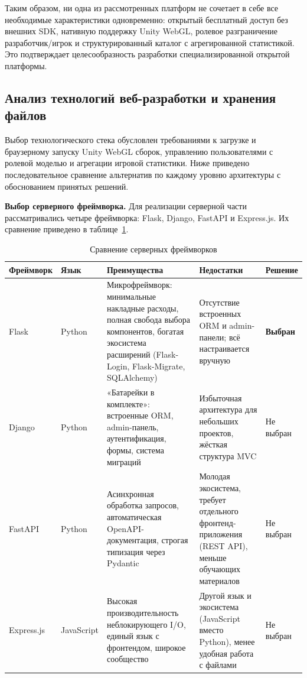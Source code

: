Таким образом, ни одна из рассмотренных платформ не сочетает в себе все необходимые
характеристики одновременно: открытый бесплатный доступ без внешних SDK, нативную
поддержку Unity WebGL, ролевое разграничение разработчик/игрок и структурированный
каталог с агрегированной статистикой. Это подтверждает целесообразность разработки
специализированной открытой платформы.

\subsection{Анализ технологий веб-разработки и хранения файлов}

Выбор технологического стека обусловлен требованиями к загрузке и браузерному запуску
Unity WebGL сборок, управлению пользователями с ролевой моделью и агрегации игровой
статистики. Ниже приведено последовательное сравнение альтернатив по каждому уровню
архитектуры с обоснованием принятых решений.

\textbf{Выбор серверного фреймворка.} Для реализации серверной части рассматривались
четыре фреймворка: Flask, Django, FastAPI и Express.js. Их сравнение приведено
в таблице~\ref{tab:frameworks}.

\begin{table}[ht!]
    \centering
    \caption{Сравнение серверных фреймворков}
    \label{tab:frameworks}
    \small
    \begin{tabularx}{\textwidth}{|p{2.3cm}|p{1.8cm}|X|X|p{2.2cm}|}
        \hline
        \textbf{Фреймворк} & \textbf{Язык} & \textbf{Преимущества} & \textbf{Недостатки} & \textbf{Решение} \\ \hline
        Flask &
        Python &
        Микрофреймворк: минимальные накладные расходы, полная свобода выбора компонентов, богатая экосистема расширений (Flask-Login, Flask-Migrate, SQLAlchemy) &
        Отсутствие встроенных ORM и admin-панели; всё настраивается вручную &
        \textbf{Выбран} \\ \hline
        Django &
        Python &
        «Батарейки в комплекте»: встроенные ORM, admin-панель, аутентификация, формы, система миграций &
        Избыточная архитектура для небольших проектов, жёсткая структура MVC &
        Не выбран \\ \hline
        FastAPI &
        Python &
        Асинхронная обработка запросов, автоматическая OpenAPI-документация, строгая типизация через Pydantic &
        Молодая экосистема, требует отдельного фронтенд-приложения (REST API), меньше обучающих материалов &
        Не выбран \\ \hline
        Express.js &
        JavaScript &
        Высокая производительность неблокирующего I/O, единый язык с фронтендом, широкое сообщество &
        Другой язык и экосистема (JavaScript вместо Python), менее удобная работа с файлами &
        Не выбран \\ \hline
    \end{tabularx}
\end{table}

